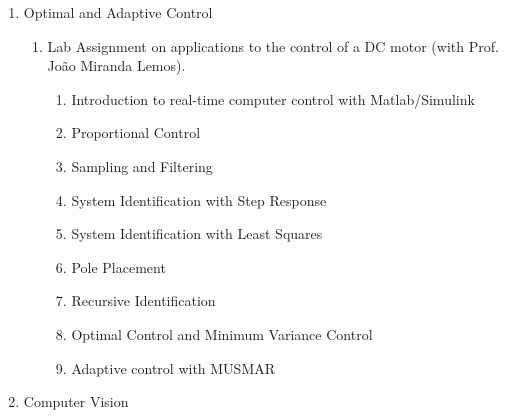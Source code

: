 \begin{enumerate}
\begin{enumerate}
    \begin{enumerate}
    \def\labelenumiii{\roman{enumiii}.}
    \item
      Use Simulink Real-Time Workshop to Interface with the Dynamical
      System (send actuation commands and read sensor data).
    \item
      Calibrate system sensors.
    \item
      Methods to prepare data for identification: sampling, filtering
      and detrending.
    \item
      Non-parametric identification: Spectral Analysis from Chirp
      Signals.
    \item
      Parametric Identification: ARMAX model estimation with PRBS
      signals.
    \item
      LQ controller design.
    \item
      LQE estimator design.
    \item
      LQG controller design.
    \item
      Integral Control and Anti-Windup.
    \end{enumerate}
  \end{enumerate}
\item
  Optimal and Adaptive Control

  \begin{enumerate}
  \def\labelenumii{\alph{enumii}.}
  \item
    Lab Assignment on applications to the control of a DC motor (with
    Prof. João Miranda Lemos).

    \begin{enumerate}
    \def\labelenumiii{\roman{enumiii}.}
    \item
      Introduction to real-time computer control with Matlab/Simulink
    \item
      Proportional Control
    \item
      Sampling and Filtering
    \item
      System Identification with Step Response
    \item
      System Identification with Least Squares
    \item
      Pole Placement
    \item
      Recursive Identification
    \item
      Optimal Control and Minimum Variance Control
    \item
      Adaptive control with MUSMAR
    \end{enumerate}
  \end{enumerate}
\item
  Computer Vision


\end{enumerate}
